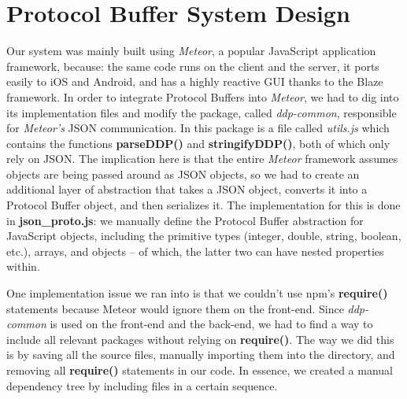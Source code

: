 \documentclass[11pt]{article} %
\begin{document}
%
%
%

\section{Protocol Buffer System Design}

Our system was mainly built using \textit{Meteor}, a popular JavaScript application framework, because: the same code runs on the client and the server, it ports easily to iOS and Android, and has a highly reactive GUI thanks to the Blaze framework. In order to integrate Protocol Buffers into \textit{Meteor}, we had to dig into its implementation files and modify the package, called \textit{ddp-common}, responsible for \textit{Meteor's} JSON communication. In this package is a file called \textit{utils.js} which contains the functions \textbf{parseDDP()} and \textbf{stringifyDDP()}, both of which only rely on JSON. The implication here is that the entire \textit{Meteor} framework assumes objects are being passed around as JSON objects, so we had to create an additional layer of abstraction that takes a JSON object, converts it into a Protocol Buffer object, and then serializes it. The implementation for this is done in \textbf{json\_proto.js}: we manually define the Protocol Buffer abstraction for JavaScript objects, including the primitive types (integer, double, string, boolean, etc.), arrays, and objects -- of which, the latter two can have nested properties within. 

One implementation issue we ran into is that we couldn't use npm's \textbf{require()} statements because Meteor would ignore them on the front-end. Since \textit{ddp-common} is used on the front-end and the back-end, we had to find a way to include all relevant packages without relying on \textbf{require()}. The way we did this is by saving all the source files, manually importing them into the directory, and removing all \textbf{require()} statements in our code. In essence, we created a manual dependency tree by including files in a certain sequence. 
\end{document}
